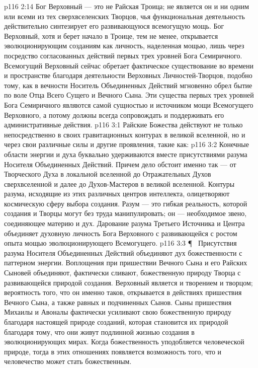 \vs p116 2:14 Бог Верховный --- это не Райская Троица; не является он и ни одним или всеми из тех сверхвселенских Творцов, чья функциональная деятельность действительно синтезирует его развивающуюся всемогущую мощь. Бог Верховный, хотя и берет начало в Троице, тем не менее, открывается эволюционирующим созданиям как личность, наделенная мощью, лишь через посредство согласованных действий первых трех уровней Бога Семиричного. Всемогущий Верховный сейчас обретает фактическое существование во времени и пространстве благодаря деятельности Верховных Личностей\hyp{}Творцов, подобно тому, как в вечности Носитель Объединенных Действий мгновенно обрел бытие по воле Отца Всего Сущего и Вечного Сына. Эти существа первых трех уровней Бога Семиричного являются самой сущностью и источником мощи Всемогущего Верховного, а потому должны всегда сопровождать и поддерживать его административные действия.
\vs p116 3:1 Райские Божества действуют не только непосредственно в своих гравитационных контурах в великой вселенной, но и через свои различные силы и другие проявления, такие как:
\vs p116 3:2 \bibnobreakspace {} Конечные области энергии и духа буквально удерживаются вместе присутствиями разума Носителя Объединенных Действий. Причем дело обстоит именно так --- от Творческого Духа в локальной вселенной до Отражательных Духов сверхвселенной и далее до Духов\hyp{}Мастеров в великой вселенной. Контуры разума, исходящие из этих различных центров интеллекта, олицетворяют космическую сферу выбора создания. Разум --- это гибкая реальность, которой создания и Творцы могут без труда манипулировать; он --- необходимое звено, соединяющее материю и дух. Дарование разума Третьего Источника и Центра объединяет духовную личность Бога Верховного с развивающейся с ростом опыта мощью эволюционирующего Всемогущего.
\vs p116 3:3 \P\ \bibnobreakspace {} Присутствия разума Носителя Объединенных Действий объединяют дух божественности с паттерном энергии. Воплощения при пришествии Вечного Сына и его Райских Сыновей объединяют, фактически сливают, божественную природу Творца с развивающейся природой создания. Верховный является и творением и творцом; вероятность того, что он именно таков, открывается в действиях пришествия Вечного Сына, а также равных и подчиненных Сынов. Сыны пришествия Михаилы и Авоналы фактически усиливают свою божественную природу благодаря настоящей природе созданий, которая становится их природой благодаря тому, что они живут подлинной жизнью создания в эволюционирующих мирах. Когда божественность уподобляется человеческой природе, тогда в этих отношениях появляется возможность того, что и человечество может стать божественным.
